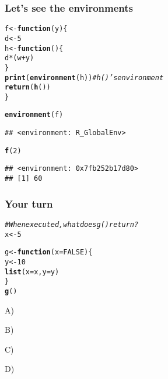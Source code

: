 \documentclass[12pt]{beamer}\usepackage[]{graphicx}\usepackage[]{color}
\makeatletter
\newcommand{\hlnum}[1]{\textcolor[rgb]{0.686,0.059,0.569}{#1}}%
\newcommand{\hlcom}[1]{\textcolor[rgb]{0.678,0.584,0.686}{\textit{#1}}}%
\newcommand{\hlopt}[1]{\textcolor[rgb]{0,0,0}{#1}}%
\newcommand{\hlstd}[1]{\textcolor[rgb]{0.345,0.345,0.345}{#1}}%
\newcommand{\hlkwa}[1]{\textcolor[rgb]{0.161,0.373,0.58}{\textbf{#1}}}%
\newcommand{\hlkwb}[1]{\textcolor[rgb]{0.69,0.353,0.396}{#1}}%
\newcommand{\hlkwc}[1]{\textcolor[rgb]{0.333,0.667,0.333}{#1}}%
\newcommand{\hlkwd}[1]{\textcolor[rgb]{0.737,0.353,0.396}{\textbf{#1}}}%
\newenvironment{kframe}{%
 \def\at@end@of@kframe{}%
 \ifinner\ifhmode%
  \def\at@end@of@kframe{\end{minipage}}%
  \begin{minipage}{\columnwidth}%
 \fi\fi%
 \def\FrameCommand##1{\hskip\@totalleftmargin \hskip-\fboxsep
 \colorbox{shadecolor}{##1}\hskip-\fboxsep
     \hskip-\linewidth \hskip-\@totalleftmargin \hskip\columnwidth}%
 \MakeFramed {\advance\hsize-\width
   \@totalleftmargin\z@ \linewidth\hsize
   \@setminipage}}%
 {\par\unskip\endMakeFramed%
 \at@end@of@kframe}
\newenvironment{knitrout}{}{} %
\makeatother
\begin{document}
\begin{frame}[fragile]
\frametitle{Let's see the environments}

\begin{knitrout}\footnotesize
{}\color{fgcolor}\begin{kframe}
\begin{alltt}
\hlstd{f} \hlkwb{<-} \hlkwa{function}\hlstd{(}\hlkwc{y}\hlstd{) \{}
  \hlstd{d} \hlkwb{<-} \hlnum{5}
  \hlstd{h} \hlkwb{<-} \hlkwa{function}\hlstd{() \{}
    \hlstd{d} \hlopt{*} \hlstd{(w} \hlopt{+} \hlstd{y)}
  \hlstd{\}}
  \hlkwd{print}\hlstd{(}\hlkwd{environment}\hlstd{(h))}   \hlcom{# h()'s environment}
  \hlkwd{return}\hlstd{(}\hlkwd{h}\hlstd{())}
\hlstd{\}}

\hlkwd{environment}\hlstd{(f)}
\end{alltt}
\begin{verbatim}
## <environment: R_GlobalEnv>
\end{verbatim}
\begin{alltt}
\hlkwd{f}\hlstd{(}\hlnum{2}\hlstd{)}
\end{alltt}
\begin{verbatim}
## <environment: 0x7fb252b17d80>
## [1] 60
\end{verbatim}
\end{kframe}
\end{knitrout}

\end{frame}


\begin{frame}[fragile]
\frametitle{Your turn}

\begin{knitrout}\footnotesize
{}\color{fgcolor}\begin{kframe}
\begin{alltt}
\hlcom{# When executed, what does g() return?}
\hlstd{x} \hlkwb{<-} \hlnum{5}

\hlstd{g} \hlkwb{<-} \hlkwa{function}\hlstd{(}\hlkwc{x} \hlstd{=} \hlnum{FALSE}\hlstd{) \{}
    \hlstd{y} \hlkwb{<-} \hlnum{10}
    \hlkwd{list}\hlstd{(}\hlkwc{x} \hlstd{= x,} \hlkwc{y} \hlstd{= y)}
\hlstd{\}}
\hlkwd{g}\hlstd{()}
\end{alltt}
\end{kframe}
\end{knitrout}
\bi
  \item[A)] 
  \item[B)] 
  \item[C)] 
  \item[D)] 
\ei

\end{frame}
\end{document}
